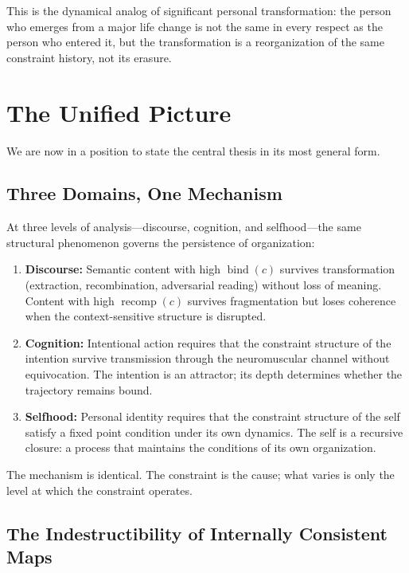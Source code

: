 \documentclass[11pt]{article}
\newcommand{\bind}{\operatorname{bind}}
\newcommand{\recomp}{\operatorname{recomp}}
\begin{document}
This is the dynamical analog of significant personal transformation: the person who
emerges from a major life change is not the same in every respect as the person who
entered it, but the transformation is a reorganization of the same constraint history,
not its erasure.

\section{The Unified Picture}

We are now in a position to state the central thesis in its most general form.

\subsection{Three Domains, One Mechanism}

At three levels of analysis---discourse, cognition, and selfhood---the same structural
phenomenon governs the persistence of organization:

\begin{enumerate}
  \item \textbf{Discourse:} Semantic content with high $\bind(c)$ survives transformation
        (extraction, recombination, adversarial reading) without loss of meaning. Content
        with high $\recomp(c)$ survives fragmentation but loses coherence when the
        context-sensitive structure is disrupted.

  \item \textbf{Cognition:} Intentional action requires that the constraint structure of
        the intention survive transmission through the neuromuscular channel without
        equivocation. The intention is an attractor; its depth determines whether the
        trajectory remains bound.

  \item \textbf{Selfhood:} Personal identity requires that the constraint structure of
        the self satisfy a fixed point condition under its own dynamics. The self is a
        recursive closure: a process that maintains the conditions of its own organization.
\end{enumerate}

The mechanism is identical. The constraint is the cause; what varies is only the level
at which the constraint operates.

\subsection{The Indestructibility of Internally Consistent Maps}
\end{document}
